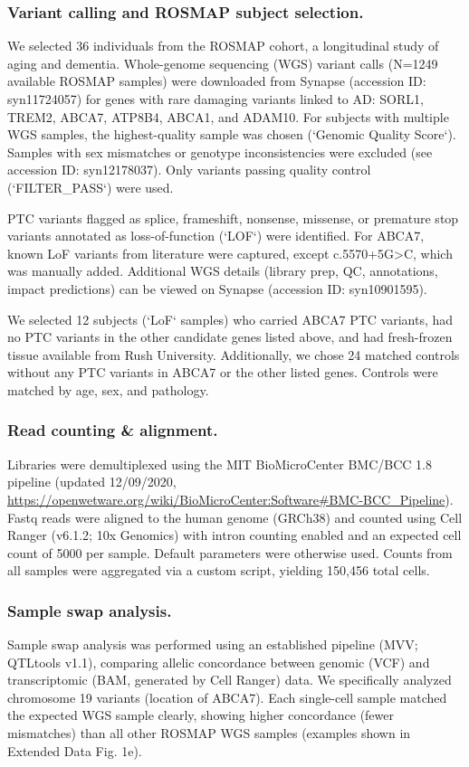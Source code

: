 \subsubsection{Variant calling and ROSMAP subject selection.}
We selected 36 individuals from the ROSMAP cohort, a longitudinal study of aging and dementia\supercite{Bennett2018-tn}. Whole-genome sequencing (WGS) variant calls (N=1249 available ROSMAP samples) were downloaded from Synapse (accession ID: syn11724057) for genes with rare damaging variants linked to AD: SORL1, TREM2, ABCA7, ATP8B4, ABCA1, and ADAM10\supercite{Holstege2022-vp}. For subjects with multiple WGS samples, the highest-quality sample was chosen (`Genomic Quality Score`). Samples with sex mismatches or genotype inconsistencies were excluded (see accession ID: syn12178037). Only variants passing quality control (`FILTER\_PASS`) were used.

PTC variants flagged as splice, frameshift, nonsense, missense, or premature stop variants annotated as loss-of-function (`LOF`) were identified. For ABCA7, known LoF variants from literature were captured, except c.5570+5G>C, which was manually added. Additional WGS details (library prep, QC, annotations, impact predictions) can be viewed on Synapse (accession ID: syn10901595). 

We selected 12 subjects (`LoF` samples) who carried ABCA7 PTC variants, had no PTC variants in the other candidate genes listed above, and had fresh-frozen tissue available from Rush University. Additionally, we chose 24 matched controls without any PTC variants in ABCA7 or the other listed genes. Controls were matched by age, sex, and pathology.

\subsubsection{Read counting & alignment.}
Libraries were demultiplexed using the MIT BioMicroCenter BMC/BCC 1.8 pipeline (updated 12/09/2020, \url{https://openwetware.org/wiki/BioMicroCenter:Software\#BMC-BCC_Pipeline}). Fastq reads were aligned to the human genome (GRCh38) and counted using Cell Ranger (v6.1.2; 10x Genomics) with intron counting enabled and an expected cell count of 5000 per sample. Default parameters were otherwise used. Counts from all samples were aggregated via a custom script, yielding 150,456 total cells.

\subsubsection{Sample swap analysis.}
Sample swap analysis was performed using an established pipeline (MVV; QTLtools v1.1)\supercite{Fort2017-jq}, comparing allelic concordance between genomic (VCF) and transcriptomic (BAM, generated by Cell Ranger) data. We specifically analyzed chromosome 19 variants (location of ABCA7). Each single-cell sample matched the expected WGS sample clearly, showing higher concordance (fewer mismatches) than all other ROSMAP WGS samples (examples shown in Extended Data Fig. 1e).

